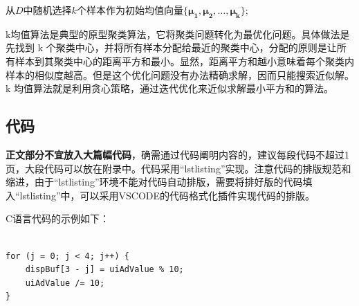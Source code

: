 \begin{algorithm}[ht]
    \renewcommand{\baselinestretch}{1.37}\selectfont
    \caption{$k$-均值算法}
     从$D$中随机选择$k$个样本作为初始均值向量$\{\boldsymbol{\mu_1},\boldsymbol{\mu_2},\dots,\boldsymbol{\mu_k}\}$; \\
    \vspace*{-3pt}
\end{algorithm}

k均值算法是典型的原型聚类算法，它将聚类问题转化为最优化问题。具体做法是先找到 k 个聚类中心，并将所有样本分配给最近的聚类中心，分配的原则是让所有样本到其聚类中心的距离平方和最小。显然，距离平方和越小意味着每个聚类内样本的相似度越高。但是这个优化问题没有办法精确求解，因而只能搜索近似解。k 均值算法就是利用贪心策略，通过迭代优化来近似求解最小平方和的算法。

\subsection{代码}
\textbf{正文部分不宜放入大篇幅代码}，确需通过代码阐明内容的，建议每段代码不超过1页，大段代码可以放在附录中。代码采用“lstlisting”实现。注意代码的排版规范和缩进，由于“lstlisting”环境不能对代码自动排版，需要将排好版的代码填入“lstlisting”中，可以采用VSCODE的代码格式化插件实现代码的排版。

C语言代码的示例如下：
\begin{lstlisting}[language={[ANSI]C}]

for (j = 0; j < 4; j++) {
	dispBuf[3 - j] = uiAdValue % 10;
	uiAdValue /= 10;
}
\end{lstlisting}

